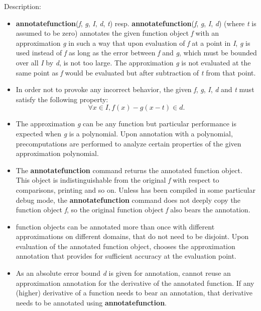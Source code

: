 \noindent Description: \begin{itemize}

\item \textbf{annotatefunction}(\emph{f}, \emph{g}, \emph{I}, \emph{d}, \emph{t}) resp. \textbf{annotatefunction}(\emph{f}, \emph{g}, \emph{I}, \emph{d}) 
   (where \emph{t} is assumed to be zero) annotates the given \sollya
   function object \emph{f} with an approximation \emph{g} in such a way that upon
   evaluation of \emph{f} at a point in \emph{I}, \emph{g} is used instead of \emph{f} as
   long as the error between \emph{f} and \emph{g}, which must be bounded over all
   \emph{I} by \emph{d}, is not too large. The approximation \emph{g} is not evaluated
   at the same point as \emph{f} would be evaluated but after subtraction of 
   \emph{t} from that point.

\item In order not to provoke any incorrect behavior, the given \emph{f}, \emph{g},
   \emph{I}, \emph{d} and \emph{t} must satisfy the following property:
   $$\forall x \in I, f(x) - g(x - t) \in d.$$

\item The approximation \emph{g} can be any \sollya function but particular
   performance is expected when \emph{g} is a polynomial. Upon annotation with
   a polynomial, precomputations are performed to analyze certain
   properties of the given approximation polynomial.

\item The \textbf{annotatefunction} command returns the annotated \sollya function
   object. This object is indistinguishable from the original \emph{f} with
   respect to \sollya comparisons, printing and so on. Unless \sollya has
   been compiled in some particular debug mode, the \textbf{annotatefunction} command does
   not deeply copy the function object \emph{f}, so the original function
   object \emph{f} also bears the annotation.

\item \sollya function objects can be annotated more than once with
   different approximations on different domains, that do not need to be
   disjoint. Upon evaluation of the annotated function object, \sollya
   chooses the approximation annotation that provides for sufficient
   accuracy at the evaluation point.

\item As an absolute error bound \emph{d} is given for annotation, \sollya cannot
   reuse an approximation annotation for the derivative of the annotated
   function. If any (higher) derivative of a function needs to bear an
   annotation, that derivative needs to be annotated using \textbf{annotatefunction}.
\end{itemize}
